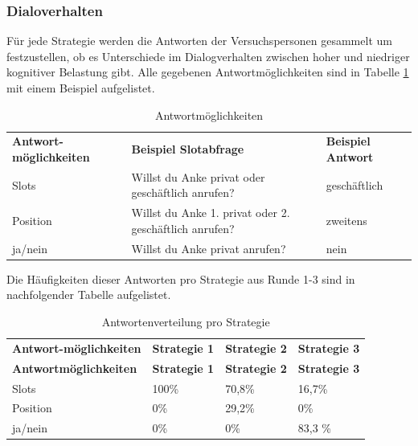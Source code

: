 \documentclass[12pt,a4paper]{scrartcl}
\begin{document}
\subsubsection{Dialoverhalten}
\label{disverh1}
Für jede Strategie werden die Antworten der Versuchspersonen gesammelt um festzustellen, ob es Unterschiede im Dialogverhalten zwischen hoher und niedriger kognitiver Belastung gibt. Alle gegebenen Antwortmöglichkeiten sind in Tabelle \ref{Dialogverhalten11} mit einem Beispiel aufgelistet.
\newline \newline \newline
\begin{longtable}{p{}p{5cm}p{}}
	\label{Dialogverhalten11}\\
	\caption[Antwortmöglichkeiten1]{Antwortmöglichkeiten}\\
	\hline
\textbf{Antwort-möglichkeiten}&\textbf{Beispiel \newline Slotabfrage}&\textbf{Beispiel \newline Antwort}\\
	\hline
Slots  & Willst du Anke privat oder geschäftlich anrufen? & geschäftlich  \\
Position & Willst du Anke 1. privat oder 2. geschäftlich anrufen? & zweitens  \\
ja/nein & Willst du Anke privat anrufen? &  nein\\ 
\hline
\end{longtable}

Die Häufigkeiten dieser Antworten pro Strategie aus Runde 1-3 sind in nachfolgender Tabelle aufgelistet.

\begin{longtable}{p{3cm}p{3cm}p{3cm}p{3cm} }
	\label{Dialogverhalten12}\\
	\caption[Antwortenverteilung pro Strategie]{Antwortenverteilung pro Strategie}\\
	\hline
\textbf{Antwort-möglichkeiten}&\textbf{Strategie 1}&\textbf{Strategie 2} &\textbf{Strategie 3}\\
	\hline
	\endfirsthead
	\hline
	\textbf{Antwortmöglichkeiten}&\textbf{Strategie 1}&\textbf{Strategie 2} &\textbf{Strategie 3}\\
	\hline
	\endhead
Slots & 100\% & 70,8\%\ & 16,7\%  \\
Position & 0\% & 29,2\% & 0\%  \\
ja/nein & 0\% & 0\%  & 83,3 \%  \\
\hline
\end{longtable}
\end{document}

